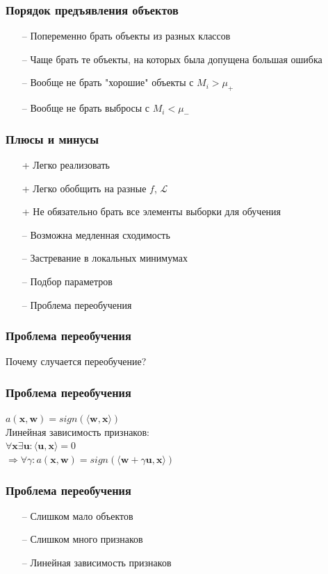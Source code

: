 \documentclass[12pt]{beamer}
\begin{document}
\begin{frame}\frametitle{Порядок предъявления объектов}
\begin{itemize}
\item[--] Попеременно брать объекты из разных классов
\item[--] Чаще брать те объекты, на которых была допущена большая ошибка
\item[--] Вообще не брать "хорошие" объекты с $M_i > \mu_+$
\item[--] Вообще не брать выбросы с $M_i < \mu_-$
\end{itemize}
\end{frame}


\begin{frame}\frametitle{Плюсы и минусы}
\begin{itemize}
\item[+] Легко реализовать
\item[+] Легко обобщить на разные $f$, $\mathcal{L}$
\item[+] Не обязательно брать все элементы выборки для обучения
\end{itemize}
\begin{itemize}
\item[--] Возможна медленная сходимость
\item[--] Застревание в локальных минимумах
\item[--] Подбор параметров
\item[--] Проблема переобучения
\end{itemize}
\end{frame}

\begin{frame}\frametitle{Проблема переобучения}
Почему случается переобучение?
\end{frame}

\begin{frame}\frametitle{Проблема переобучения}
$a(\mathbf{x}, \mathbf{w}) = sign(\langle \mathbf{w}, \mathbf{x}\rangle)$\\
Линейная зависимость признаков:\\
$\forall \mathbf{x} \exists \mathbf{u}: \langle \mathbf{u}, \mathbf{x}\rangle = 0$\\
$\Rightarrow \forall \gamma: a(\mathbf{x}, \mathbf{w}) = sign(\langle \mathbf{w} + \gamma \mathbf{u}, \mathbf{x}\rangle)$
\end{frame}

\begin{frame}\frametitle{Проблема переобучения}
\begin{itemize}
\item[--] Слишком мало объектов
\item[--] Слишком много признаков
\item[--] Линейная зависимость признаков
\end{itemize}
\end{frame}
\end{document}
